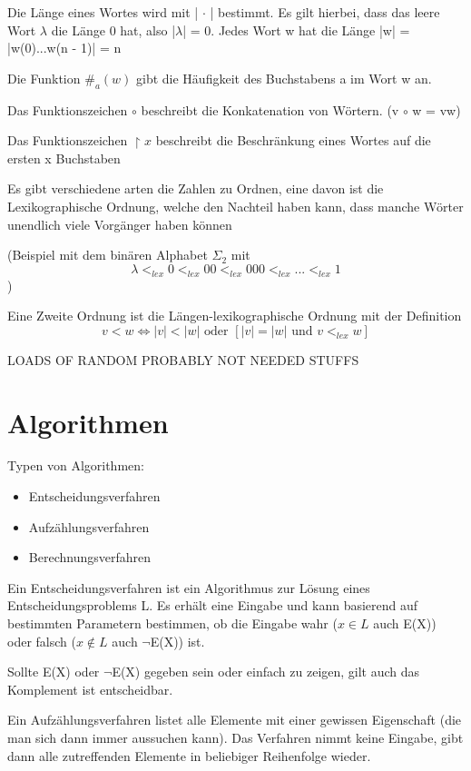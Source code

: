 \documentclass[12pt,a4paper]{article} %
\begin{document}
	Die Länge eines Wortes wird mit | $\cdot$ | bestimmt. Es gilt hierbei, dass das leere Wort $\lambda$ die Länge 0 hat, also |$\lambda$| = 0. Jedes Wort w hat die Länge |w| = |w(0)...w(n - 1)| = n
	
	Die Funktion $\#_a(w)$ gibt die Häufigkeit des Buchstabens a im Wort w an.
	
	Das Funktionszeichen $\circ$ beschreibt die Konkatenation von Wörtern. (v $\circ$ w = vw)
	
	Das Funktionszeichen $\upharpoonright x$ beschreibt die Beschränkung eines Wortes auf die ersten x Buchstaben
	
	Es gibt verschiedene arten die Zahlen zu Ordnen, eine davon ist die Lexikographische Ordnung, welche den Nachteil haben kann, dass manche Wörter unendlich viele Vorgänger haben können 
	
	(Beispiel mit dem binären Alphabet $\Sigma_2$ mit \[\lambda <_{lex} 0 <_{lex} 00 <_{lex} 000 <_{lex} ... <_{lex} 1\])
	
	Eine Zweite Ordnung ist die Längen-lexikographische Ordnung mit der Definition \[v < w \Leftrightarrow |v| < |w| \text{ oder } [|v| = |w| \text{ und } v <_{lex} w]\]
	
	LOADS OF RANDOM PROBABLY NOT NEEDED STUFFS
	
	\section{Algorithmen}
	
	Typen von Algorithmen:
	\begin{itemize}
		\item Entscheidungsverfahren
		\item Aufzählungsverfahren
		\item Berechnungsverfahren
	\end{itemize}
	
	Ein Entscheidungsverfahren ist ein Algorithmus zur Lösung eines Entscheidungsproblems L. Es erhält eine Eingabe und kann basierend auf bestimmten Parametern bestimmen, ob die Eingabe wahr ($x \in L$ auch E(X)) oder falsch ($x \notin L$ auch $\neg$E(X)) ist. 
	
	Sollte E(X) oder $\neg$E(X) gegeben sein oder einfach zu zeigen, gilt auch das Komplement ist entscheidbar.
	
	Ein Aufzählungsverfahren listet alle Elemente mit einer gewissen Eigenschaft (die man sich dann immer aussuchen kann). Das Verfahren nimmt keine Eingabe, gibt dann alle zutreffenden Elemente in beliebiger Reihenfolge wieder.
	
\end{document}
